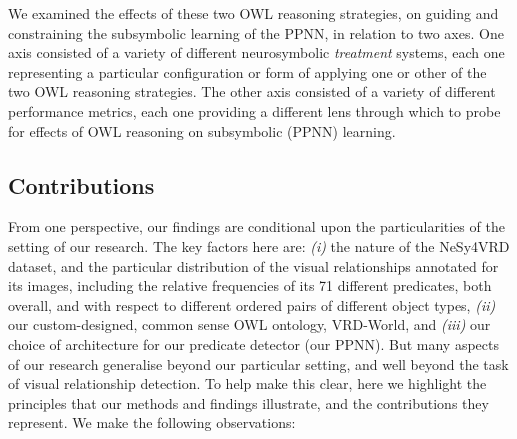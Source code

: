\documentclass[]{jair}
\begin{document}
We examined the effects of these two OWL reasoning strategies, on guiding and constraining the subsymbolic learning of the PPNN, in relation to two axes.
One axis consisted of a variety of different neurosymbolic \emph{treatment} systems, each one representing a particular configuration or form of applying one or other of the two OWL reasoning strategies.
The other axis consisted of a variety of different performance metrics, each one providing a different lens through which to probe for effects of OWL reasoning on subsymbolic (PPNN) learning.

\subsection{Contributions}
From one perspective, our findings are conditional upon the particularities of the setting of our research.
The key factors here are: \textit{(i)} the nature of the NeSy4VRD dataset, and the particular distribution of the visual relationships annotated for its images, including the relative frequencies of its 71 different predicates, both overall, and with respect to different ordered pairs of different object types, \textit{(ii)} our custom-designed, common sense OWL ontology, VRD-World, and \textit{(iii)} our choice of architecture for our predicate detector (our PPNN).
But many aspects of our research generalise beyond our particular setting, and well beyond the task of visual relationship detection.
To help make this clear, here we highlight the principles that our methods and findings illustrate, and the contributions they represent. 
We make the following observations:
\end{document}
